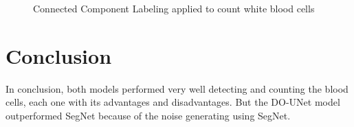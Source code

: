 \begin{figure}[H]
\centering
\begin{minipage}{.5\textwidth}
  \centering
\end{minipage}%
\begin{minipage}{.5\textwidth}
  \centering
\end{minipage}
  \caption{Connected Component Labeling applied to count white blood cells}
\end{figure}

\section{Conclusion}
In conclusion, both models performed very well detecting and counting the blood cells, each one with its advantages and disadvantages.
But the DO-UNet model outperformed SegNet because of the noise generating using SegNet.

\newpage

